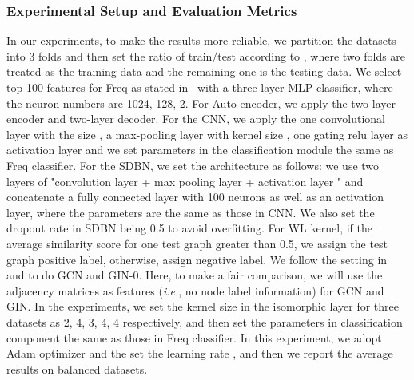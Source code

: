 \documentclass{article} \usepackage{iclr2020_conference,times}
\newcommand{\ie}[0]{\textit{i.e.}}
\begin{document}
 \subsubsection{Experimental Setup and Evaluation Metrics}
\vspace*{-5pt}
  In our experiments, to make the results more reliable, we partition the datasets into 3 folds and then set the ratio of train/test according to , where two folds are treated as the training data and the remaining one is the testing data. We select top-100 features for Freq as stated in~\cite{wang2017structural} with a three layer MLP classifier, where the neuron numbers are 1024, 128, 2. For Auto-encoder, we apply the two-layer encoder and two-layer decoder. For the CNN, we apply the one convolutional layer with the size , a max-pooling layer with kernel size , one gating relu layer as activation layer and we set parameters in the classification module the same as Freq classifier.  For the SDBN, we set the architecture as follows: we use two layers of "convolution layer + max pooling layer + activation layer " and concatenate a fully connected layer with 100 neurons as well as an activation layer, where the parameters are the same as those in CNN. We also set the dropout rate in SDBN being 0.5 to avoid overfitting. For WL kernel, if the average similarity score for one test graph greater than 0.5, we assign the test graph positive label, otherwise, assign negative label. We follow the setting in ~\cite{kipf2016semi} and \cite{xu2018powerful} to do GCN and GIN-0. Here, to make a fair comparison, we will use the adjacency matrices as features (\ie, no node label information) for GCN and GIN. In the experiments, we set the kernel size  in the isomorphic layer for three datasets as 2, 4, 3, 4, 4 respectively, and then set the parameters in classification component the same as those in Freq classifier. In this experiment, we adopt Adam optimizer and the set the learning rate , and then we report the average results on balanced datasets. 


\vspace*{-8pt}
\end{document}
